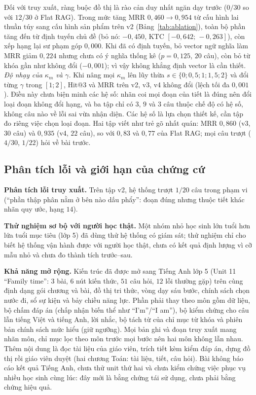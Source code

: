 \documentclass[10pt,a4paper,twocolumn]{article}
\begin{document}
Đối với truy xuất, ràng buộc đồ thị là rào cản duy nhất ngăn dạy trước ($0/30$ so với $12/30$ ở Flat RAG). Trong mức tăng MRR $0{,}460\to0{,}954$ từ cấu hình lai thuần túy sang cấu hình sản phẩm trên v2 (Bảng~\ref{tab:ablation}), toàn bộ phần tăng đến từ định tuyến chủ đề (bỏ nó: $-0{,}450$, KTC $[-0{,}642;\,-0{,}263]$), còn xếp hạng lại sư phạm góp $0{,}000$. Khi đã có định tuyến, bỏ vector ngữ nghĩa làm MRR giảm $0{,}224$ nhưng chưa có ý nghĩa thống kê ($p=0{,}125$, $20$ câu), còn bỏ từ khóa gần như không đổi ($-0{,}001$); vì vậy không khẳng định vector là cần thiết. \emph{Độ nhạy của $\kappa_m$ và $\gamma$.} Khi nâng mọi $\kappa_m$ lên lũy thừa $s\in\{0;0{,}5;1;1{,}5;2\}$ và đổi từng $\gamma$ trong $[1;2]$, Hit@3 và MRR trên v2, v3, v4 không đổi (lệch tối đa $0{,}001$). Điều này chưa biện minh các hệ số: nhãn coi mọi đoạn của tiết là đúng nên đổi loại đoạn không đổi hạng, và ba tập chỉ có $3$, $9$ và $3$ câu thuộc chế độ có hệ số, không câu nào về lỗi sai vừa nhận diện. Các hệ số là lựa chọn thiết kế, cần tập đo riêng việc chọn loại đoạn. Hai tập viết như trẻ gõ nhất quán: MRR $0{,}860$ (v3, $30$ câu) và $0{,}935$ (v4, $22$ câu), so với $0{,}83$ và $0{,}77$ của Flat RAG; mọi câu trượt ($4/30$, $1/22$) hỏi về bài trước.

\subsection{Phân tích lỗi và giới hạn của chứng cứ}
\textbf{Phân tích lỗi truy xuất.} Trên tập v2, hệ thống trượt $1/20$ câu trong phạm vi (``phần thập phân nằm ở bên nào dấu phẩy'': đoạn đúng nhưng thuộc tiết khác nhãn quy ước, hạng $14$).

\textbf{Thử nghiệm sơ bộ với người học thật.} Một nhóm nhỏ học sinh lớn tuổi hơn lứa tuổi mục tiêu (lớp 5) đã dùng thử hệ thống có giám sát; thử nghiệm chỉ cho biết hệ thống vận hành được với người học thật, chưa có kết quả định lượng vì cỡ mẫu nhỏ và chưa đo thành tích trước--sau.

\textbf{Khả năng mở rộng.} Kiến trúc đã được mở sang Tiếng Anh lớp 5 (Unit 11 ``Family time'': $3$ bài, $6$ nút kiến thức, $51$ câu hỏi, $12$ lỗi thường gặp) trên cùng định dạng gói chương và bài, đồ thị tri thức, vòng dạy sáu bước, chính sách chọn nước đi, sổ sự kiện và bảy chiều năng lực. Phần phải thay theo môn gồm dữ liệu, bộ chấm đáp án (chấp nhận biến thể như ``I'm''/``I am''), bộ kiểm chứng cho câu lẫn tiếng Việt và tiếng Anh, lời nhắc, bộ tách từ của chỉ mục từ khóa và phiên bản chính sách mức hiểu (giữ ngưỡng). Mọi bản ghi và đoạn truy xuất mang nhãn môn, chỉ mục lọc theo môn trước mọi bước nên hai môn không lẫn nhau. Thêm nội dung là đọc tài liệu của giáo viên, trích tiết kèm kiểm đáp án, dựng đồ thị rồi giáo viên duyệt (hai chương Toán: \NDocs{} tài liệu, \NNodes{} tiết, \NItems{} câu hỏi). Bài không báo cáo kết quả Tiếng Anh, chưa thử unit thứ hai và chưa kiểm chứng việc phục vụ nhiều học sinh cùng lúc: đây mới là bằng chứng tái sử dụng, chưa phải bằng chứng hiệu quả.
\end{document}
